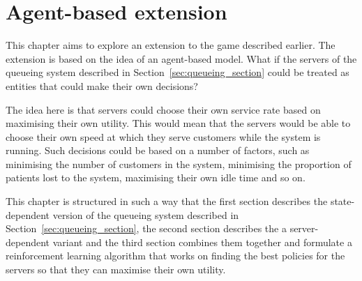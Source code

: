 \chapter{Agent-based extension}

This chapter aims to explore an extension to the game described earlier.
The extension is based on the idea of an agent-based model.
What if the servers of the queueing system described in
Section~\ref{sec:queueing_section} could be treated as entities that could make
their own decisions?

The idea here is that servers could choose their own service rate based on
maximising their own utility.
This would mean that the servers would be able to choose their own speed at
which they serve customers while the system is running.
Such decisions could be based on a number of factors, such as minimising the
number of customers in the system, minimising the proportion of patients lost
to the system, maximising their own idle time and so on.

This chapter is structured in such a way that the first section describes the
state-dependent version of the queueing system described in
Section~\ref{sec:queueing_section}, the second section describes the
a server-dependent variant and the third section combines them together and
formulate a reinforcement learning algorithm that works on finding the best
policies for the servers so that they can maximise their own utility.









